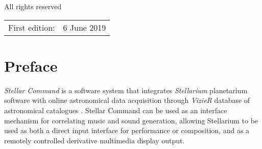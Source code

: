 \documentclass[10pt,a4paper,extrafontsizes]{memoir}
\newif\ifMASTER
\newcommand\svnidlong[4]{}
\begin{document}
All rights reserved



\begin{center}
\begin{tabular}{ll}
First edition:                        & 6 June 2019 \\

\end{tabular}
\end{center}
\ifMASTER
Manual last changed \svnyear/\svnmonth/\svnday
\fi

\endgroup

\clearpage

\pagestyle{headings}

\setupshorttoc
\tableofcontents
\clearpage
\setupparasubsecs
\setupmaintoc

\begingroup

%




\tableofcontents

\endgroup


\setlength{\unitlength}{1pt}
\clearpage
\listoffigures
\clearpage
\listoftables
\clearpage




\svnidlong
{$Ignore: $}
{$LastChangedDate: 2014-11-05 16:28:11 +0100 (Wed, 05 Nov 2014) $}
{$LastChangedRevision: 501 $}
{$LastChangedBy: daleif $}

\chapter{Preface}
    
    \textit{Stellar Command} is a software system that integrates \textit{Stellarium} planetarium software with online astronomical data acquisition through \textit{VizieR} database of astronomical catalogues \cite{ochsenbein2000vizier}. Stellar Command can be used as an interface mechanism for correlating music and sound generation, allowing Stellarium to be used as both a direct input interface for performance or composition, and as a remotely controlled derivative multimedia display output.   
\end{document}
